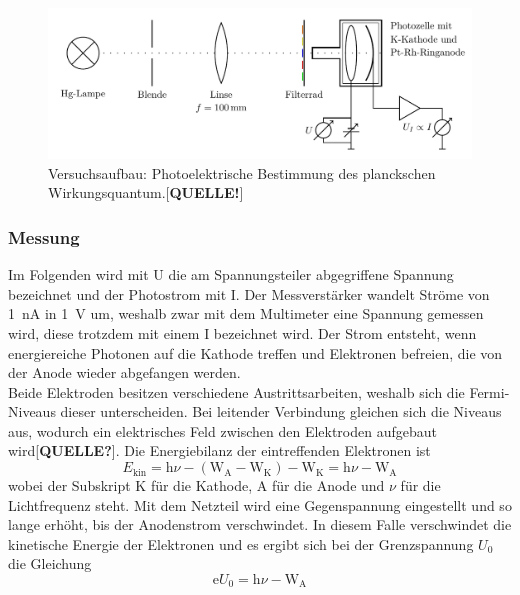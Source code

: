 \begin{figure}[htb]
	\centering
	\includegraphics[width=0.8\linewidth]{../figs/photozelle_optikbank}
	\caption{Versuchsaufbau: Photoelektrische Bestimmung des planckschen Wirkungsquantum.[\textbf{QUELLE!}]}
	\label{fig:photozelle_optikbank}
\end{figure}

\subsubsection{Messung}
Im Folgenden wird mit U die am Spannungsteiler abgegriffene Spannung bezeichnet und der Photostrom
mit I. Der Messverstärker wandelt Ströme von \SI{1}{\nano\ampere} in \SI{1}{\volt} um,
weshalb zwar mit dem Multimeter eine Spannung gemessen wird, diese trotzdem mit einem I bezeichnet
wird. Der Strom entsteht, wenn energiereiche Photonen auf die Kathode treffen und
Elektronen befreien, die von der Anode wieder abgefangen werden.\\
Beide Elektroden besitzen verschiedene Austrittsarbeiten, weshalb sich die Fermi-Niveaus
dieser unterscheiden. Bei leitender Verbindung gleichen sich die Niveaus aus, wodurch
ein elektrisches Feld zwischen den Elektroden aufgebaut wird[\textbf{QUELLE?}]. Die Energiebilanz der eintreffenden
Elektronen ist
\begin{equation}
	E_\mathrm{kin} = \mathrm h\nu - (\mathrm W_{\mathrm A} - \mathrm W_{\mathrm K}) 
	- \mathrm W_{\mathrm K} = \mathrm h\nu - \mathrm W_{\mathrm A}\nonumber
\end{equation}
wobei der Subskript K für die Kathode, A für die Anode und $\nu$ für die Lichtfrequenz steht.
Mit dem Netzteil wird eine Gegenspannung eingestellt und so lange erhöht, bis
der Anodenstrom verschwindet. In diesem Falle verschwindet die kinetische Energie der Elektronen
und es ergibt sich bei der Grenzspannung $U_0$ die Gleichung
\begin{equation}
	\mathrm eU_0 = \mathrm h\nu - \mathrm W_{\mathrm A}
	\label{eq:gegenfeldmethode}
\end{equation}


